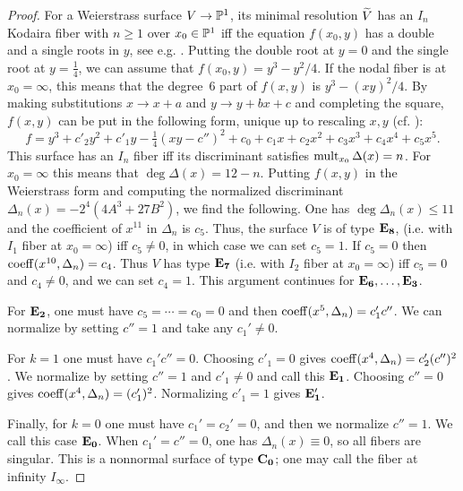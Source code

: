 \documentclass[table,x11names]{amsart}
\begin{document}
\begin{proof}
   For a Weierstrass surface $V\to {\mathbb P}^1$, its minimal resolution
   ${\widetilde V}$ has an $I_n$ Kodaira fiber with $n\ge1$ over $x_0\in{\mathbb P}^1$
   iff the equation $f(x_0,y)$ has a double and a single roots in
   $y$, see e.g. \cite[IV.2.2]{miranda1989the-basic-theory}.  Putting
   the double root at $y=0$ and the single root at $y=\frac14$, we can
   assume that $f(x_0,y) = y^3 - y^2/4$. If the nodal fiber is at
   $x_0=\infty$, this means that the degree~6 part of $f(x,y)$ is
   $y^3-(xy)^2/4$.  By making substitutions $x\to x+a$ and
   $y\to y+bx +c$ and completing the square, $f(x,y)$ can
   be put in the following form, unique up to rescaling $x,y$ 
   (cf. \cite[Sec. 5]{alexeev17ade-surfaces}):
   \begin{displaymath}
     f =
     y^3 + c'_2 y^2 + c'_1 y 
     - \tfrac14(xy-c'')^2 +
     c_0 + c_1x + c_2x^2 +c_3x^3 + c_4x^4 + c_5x^5.
   \end{displaymath}
   This surface has an $I_n$ fiber iff its discriminant satisfies
   $\operatorname{mult}_{x_0}\Delta(x) = n$. For $x_0=\infty$ this means that
   $\deg\Delta(x) = 12-n$.  Putting $f(x,y)$ in the Weierstrass form
   and computing the normalized discriminant
   $\Delta_n(x)=-2^4(4A^3+27B^2)$, we find the following.
   One has
   $\deg\Delta_n(x)\le 11$ and the coefficient of $x^{11}$ in
   $\Delta_n$ is $c_5$. Thus, the surface $V$ is of type ${\bf E_8}$,
   (i.e. with $I_1$ fiber at $x_0=\infty$) iff $c_5\ne0$, in
   which case we can set $c_5=1$. If $c_5=0$ then
   $\operatorname{coeff}(x^{10},\Delta_n) = c_4$. Thus $V$ has type ${\bf E_7}$
   (i.e. with $I_2$ fiber at $x_0=\infty$) iff $c_5=0$ and $c_4\ne0$, and we can
   set $c_4=1$. This argument continues for ${\bf E_6},\dotsc, {\bf E_3}$.

   For ${\bf E_2}$, one must have $c_5=\dotsb = c_0=0$ and then
   $\operatorname{coeff}({x^5},\Delta_n)=c_1'c''$. We can normalize by setting
   $c''=1$ and take any $c_1'\ne0$.

   For $k=1$ one must have $c_1'c''=0$. Choosing $c'_1=0$ gives
   $\operatorname{coeff}(x^4,\Delta_n)=c_2'(c'')^2$. We normalize by setting $c''=1$
   and $c'_1\ne0$ and call this ${\bf E_1}$. Choosing $c''=0$ gives
   $\operatorname{coeff}(x^4,\Delta_n)=(c_1')^2$. Normalizing $c'_1=1$ gives ${\bf E'_1}$.

   Finally, for $k=0$ one must have
   $c_1'= c_2'=0$, and then we normalize $c''=1$. We call this case ${\bf E_0}$.
   When $c_1'=c''=0$, one has
   $\Delta_n(x)\equiv0$, so all fibers are singular. This is a nonnormal
   surface of type ${\bf C_0}$; one may call the fiber at infinity $I_\infty$.
   

\end{proof}
\end{document}
